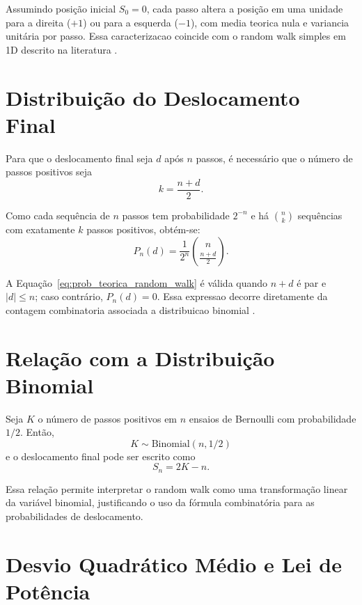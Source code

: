 Assumindo posição inicial $S_0=0$, cada passo altera a posição em uma unidade para a direita ($+1$) ou para a esquerda ($-1$), com media teorica nula e variancia unitária por passo.
Essa caracterizacao coincide com o random walk simples em 1D descrito na literatura \cite{mathworld_random_walk_1d}.

\section{Distribuição do Deslocamento Final}

Para que o deslocamento final seja $d$ após $n$ passos, é necessário que o número de passos positivos seja
\begin{equation}
k = \frac{n+d}{2}.
\end{equation}

Como cada sequência de $n$ passos tem probabilidade $2^{-n}$ e há $\binom{n}{k}$ sequências com exatamente $k$ passos positivos, obtém-se:
\begin{equation}
P_n(d) = \frac{1}{2^n}\binom{n}{\frac{n+d}{2}}.
\label{eq:prob_teorica_random_walk}
\end{equation}

A Equação~\ref{eq:prob_teorica_random_walk} é válida quando $n+d$ é par e $|d|\le n$; caso contrário, $P_n(d)=0$.
Essa expressao decorre diretamente da contagem combinatoria associada a distribuicao binomial \cite{mathworld_random_walk_1d,mathworld_binomial_distribution}.

\section{Relação com a Distribuição Binomial}

Seja $K$ o número de passos positivos em $n$ ensaios de Bernoulli com probabilidade $1/2$. Então,
\begin{equation}
K \sim \text{Binomial}(n, 1/2)
\end{equation}
e o deslocamento final pode ser escrito como
\begin{equation}
S_n = 2K - n.
\end{equation}

Essa relação permite interpretar o random walk como uma transformação linear da variável binomial, justificando o uso da fórmula combinatória para as probabilidades de deslocamento.

\section{Desvio Quadrático Médio e Lei de Potência}

